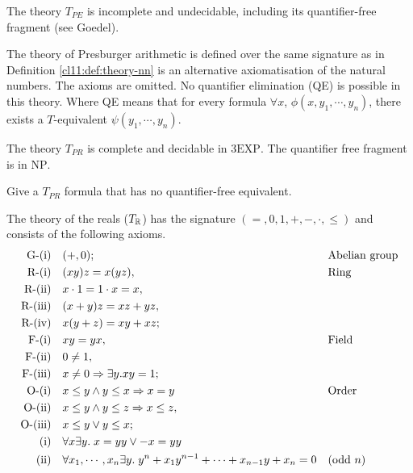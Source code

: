 \begin{theorem}
The theory $T_{PE}$ is incomplete and undecidable,  
including its quantifier-free fragment (see Goedel).
\end{theorem}

\begin{remark}[$T_{PR}$]
\label{cl11:rem:pres}
   The theory of Presburger arithmetic is defined over the same signature as in Definition \ref{cl11:def:theory-nn} is an alternative axiomatisation of the natural numbers. The axioms are omitted.
   No quantifier elimination (QE) is possible in this theory.
   Where QE means that for every formula $\forall x$, $\phi (x, y_1, \cdots, y_n)$, there exists a $T$-equivalent $\psi (y_1, \cdots, y_n)$. 
\end{remark}

\begin{theorem}
    The theory $T_{PR}$ is complete and decidable in $3\mathrm{EXP}$. The quantifier free fragment is in $\mathrm{NP}$.
\end{theorem}

\begin{exercise}
    Give a $T_{PR}$ formula that has no quantifier-free equivalent. 
\end{exercise}

\begin{definition}[$T_{\RN}$]
      The theory of the reals ($T_{\RN}$) has the signature $(=, 0, 1, +, -, \cdot, \leq)$ and consists of the following axioms.
      \begin{align*}
          \text{G-(i)} \quad&  (+,0) ;&&\text{Abelian group} \\
          \text{R-(i)}\quad& (xy)z=x(yz),\; && \text{Ring} \\
        \text{R-(ii)}\quad&   x \cdot 1 = 1 \cdot x = x, &&\; \\
          \text{R-(iii)}\quad&  (x+y)z = xz + yz,&& \\
          \text{R-(iv)}\quad &  x(y+z) = xy + xz; &&\\
          \text{F-(i)}\quad& xy=yx,\; && \text{Field} \\
        \text{F-(ii)}\quad&  0 \neq 1,&& \\
        \text{F-(iii)}\quad&  x \neq 0 \Rightarrow \exists y . xy=1;&& \\
        \text{O-(i)}\quad& x \leq y \land y \leq x \Rightarrow x=y && \text{Order} \\
        \text{O-(ii)}\quad& x \leq y \land y \leq z \Rightarrow x \leq z,&& \\
         \text{O-(iii)}\quad& x \leq y \lor y \leq x;&& \\
        \text{(i)}\quad& \forall x\exists y. \; x = yy \lor -x = yy &&  \\
        \text{(ii)}\quad& \forall x_1, \cdots,x_n \exists y. \; y^n + x_1y^{n-1} + \cdots + x_{n-1}y + x_n = 0 && \text{(odd $n$)} \\
      \end{align*}      
\end{definition}


